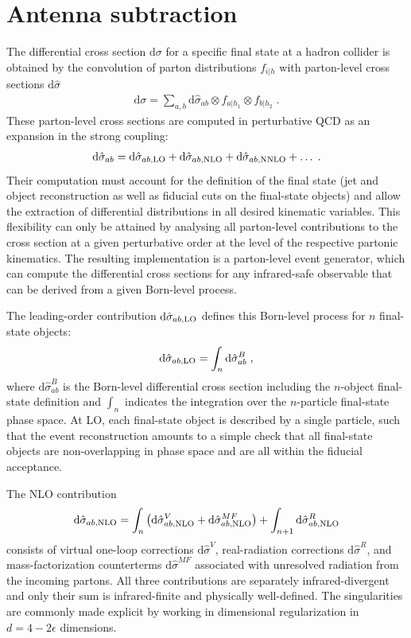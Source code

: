 \documentclass{SciPost}
\DeclareRobustCommand{\ensuremathrm}[1]{\ensuremath{\mathrm{#1}}}
\DeclareRobustCommand{\rd}{\ensuremathrm{d}}
\begin{document}
\section{Antenna subtraction}
\label{sec:ant}
The differential cross section $\rd\sigma$ for a specific final state at a hadron collider is obtained by the convolution of parton distributions $f_{i|h}$ with
parton-level cross sections $\rd\hat{\sigma}$
\begin{align}
  \rd\sigma = \sum_{a,b} \rd\hat{\sigma}_{ab} \otimes f_{a|h_1}\otimes f_{b|h_2}
  \;.
\end{align}
These parton-level cross sections are computed in perturbative QCD as an expansion in the strong coupling:
\begin{align}
  \rd\hat{\sigma}_{ab} = \rd\hat{\sigma}_{ab,{\rm LO}} + \rd\hat{\sigma}_{ab,{\rm NLO}} + \rd\hat{\sigma}_{ab,{\rm NNLO}} + \ldots
  \;.
\end{align}
Their computation must account for the definition of the final state (jet and object reconstruction as well as fiducial cuts on the final-state objects) and allow the extraction of
differential distributions in all desired kinematic variables. This flexibility can only be attained by analysing
all parton-level contributions to the cross section at a given perturbative order at the level of the respective partonic kinematics. The resulting implementation is a parton-level
event generator, which can compute the differential cross sections for any infrared-safe observable that can be derived from a given Born-level process.

The leading-order contribution $\rd\hat{\sigma}_{ab,{\rm LO}}$ defines this Born-level process for $n$ final-state objects:
\begin{align}
  \rd\hat{\sigma}_{ab,{\rm LO}} = \int_n \rd\hat{\sigma}_{ab}^{B}
  \;,
\end{align}
where $\rd\hat{\sigma}_{ab}^{B}$ is the Born-level differential cross section including the $n$-object final-state definition
and $\int_n$ indicates the integration over the $n$-particle final-state phase space.
At LO, each final-state object is described by a single particle, such that the event reconstruction amounts to a simple check that all final-state objects are non-overlapping in phase space and are all within the fiducial acceptance.

The NLO contribution
\begin{align}
\label{eq:NLOcs}
  \rd\hat{\sigma}_{ab,{\rm NLO}}=\int_{n}\left(\rd\hat{\sigma}^{V}_{ab,{\rm NLO}}+\rd\hat{\sigma}^{MF}_{ab,{\rm NLO}}\right)+
  \int_{n+1}\rd\hat{\sigma}^{R}_{ab,{\rm NLO}}
\end{align}
consists of virtual one-loop corrections $\rd\hat{\sigma}^{V}$, real-radiation corrections $\rd\hat{\sigma}^{R}$,
 and mass-factorization counterterms
$\rd\hat{\sigma}^{MF}$ associated
with unresolved radiation from the incoming partons.
All three contributions are separately infrared-divergent and only their sum is infrared-finite and physically well-defined.
The singularities are commonly made explicit by working in dimensional regularization in $d=4-2\epsilon$ dimensions.
\end{document}
